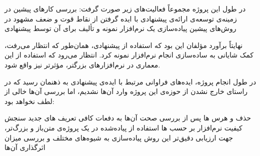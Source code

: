 
در طول این پروژه مجموعاً فعالیت‌های زیر صورت گرفت:
 بررسی کارهای پیشین در زمینه‌ی توسعه‌ی 
 ارائه‌ی   پیشنهادی با ایده گرفتن از نقاط قوت و ضعف مشهود در روش‌های پیشین
 پیاده‌سازی یک نرم‌افزار نمونه و تألیف  برای آن توسط  پیشنهادی

نهایتاً برآورد مؤلفان این بود که استفاده از  پیشنهادی، همان‌طور که انتظار می‌رفت، کمک شایانی به ساده‌سازی انجام  نرم‌افزار نمونه کرد. انتظار می‌رود که استفاده از این معماری در  نرم‌افزارهای بزرگتر، مؤثرتر نیز واقع شود.

در طول انجام پروژه، ایده‌های فراوانی مرتبط با ایده‌ی  پیشنهادی به ذهنمان رسید که در راستای خارج نشدن از حوزه‌ی این پروژه وارد آن‌ها نشدیم، اما بررسی آن‌ها خالی از لطف نخواهد بود:

 حذف و هرس ‌ها پس از بررسی صحت آن‌ها به دفعات کافی
 تعریف ‌های جدید سنجش کیفیت نرم‌افزار بر حسب ‌ها
 استفاده از   پیاده‌شده در یک پروژه‌ی متن‌باز و بزرگ‌تر، جهت ارزیابی دقیق‌تر این روش
 پیاده‌سازی  به شیوه‌های مختلف و بررسی میزان اثرگذاری آن‌ها
